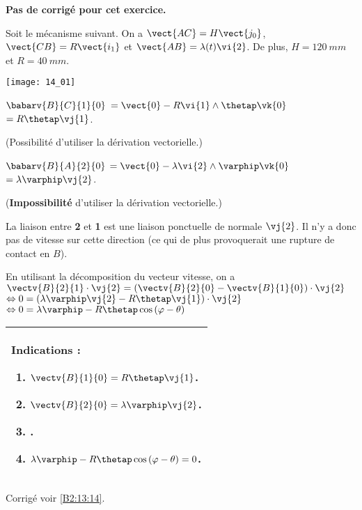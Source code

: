 \normalfalse \difficiletrue \tdifficilefalse
\correctiontrue


\setcounter{numques}{0}
\ifcorrection
\else
\textbf{Pas de corrigé pour cet exercice.}
\fi

\ifprof
\else
Soit le mécanisme suivant. On a $\vect{AC}=H\vect{j_0}$, $\vect{CB}=R\vect{i_1}$ et $\vect{AB}=\lambda(t) \vi{2}$. De plus, 
$H=\SI{120}{mm}$ et $R=\SI{40}{mm}$. 

\begin{center}
\texttt{[image: 14\_01]}
\end{center}
\fi


\ifprof
$\babarv{B}{C}{1}{0}$ 
$=\vect{0}-R\vi{1}\wedge\thetap\vk{0}$
$=R\thetap\vj{1}$.

(Possibilité d'utiliser la dérivation vectorielle.)

\else
\fi

\ifprof
$\babarv{B}{A}{2}{0}$ 
$=\vect{0}-\lambda \vi{2}\wedge\varphip\vk{0}$
$=\lambda\varphip\vj{2}$.

(\textbf{Impossibilité} d'utiliser la dérivation vectorielle.)

\else
\fi

\ifprof
La liaison entre \textbf{2} et \textbf{1} est une liaison ponctuelle de normale $\vj{2}$. Il n'y a donc pas de vitesse sur cette direction (ce qui de plus provoquerait une rupture de contact en $B$). 
\else
\fi

\ifprof
En utilisant la décomposition du vecteur vitesse, on a
$\vectv{B}{2}{1}\cdot \vj{2} =\left( \vectv{B}{2}{0} - \vectv{B}{1}{0}\right) \cdot \vj{2}$
$ \Leftrightarrow {0} =\left( \lambda\varphip\vj{2} - R\thetap\vj{1}\right) \cdot \vj{2}$
$ \Leftrightarrow {0} = \lambda\varphip - R\thetap \cos \left( \varphi - \theta\right)$

\else
\fi





\ifprof
\else
\footnotesize
\ifcolle
\else
\begin{center}
\begin{tabular}{|p{.9\linewidth}|}
\hline
Indications :
\begin{enumerate}
\item $\vectv{B}{1}{0}=R\thetap\vj{1}$.
\item $\vectv{B}{2}{0}=\lambda\varphip\vj{2}$.
\item .
\item $ \lambda\varphip - R\thetap \cos \left( \varphi - \theta\right)=0$.
\end{enumerate} \\ \hline
\end{tabular}
\end{center}
\fi
\normalsize

\begin{flushright}
\footnotesize{Corrigé  voir \ref{B2:13:14}.}
\end{flushright}%
\fi